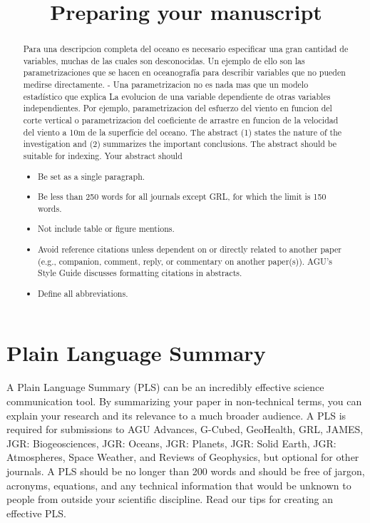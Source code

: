 \documentclass[
]{agujournal2019}
\providecommand{\tightlist}{%
  \setlength{\itemsep}{0pt}\setlength{\parskip}{0pt}}\usepackage{longtable,booktabs,array}
\begin{document}
\title{Preparing your manuscript}



\begin{abstract}
Para una descripci\textquotesingle on completa del
oc\textquotesingle eano es necesario especificar una gran cantidad de
variables, muchas de las cuales son desconocidas. Un ejemplo de ello son
las parametrizaciones que se hacen en oceanografía para describir
variables que no pueden medirse directamente. - Una
parametrizaci\textquotesingle on no es nada mas que un modelo
estadístico que explica La evoluci\textquotesingle on de una variable
dependiente de otras variables independientes. Por ejemplo,
parametrizaci\textquotesingle on del esfuerzo del viento en
funci\textquotesingle on del corte vertical o
parametrizaci\textquotesingle on del coeficiente de arrastre en
funci\textquotesingle on de la velocidad del viento a 10m de la
superfície del oc\textquotesingle eano. The abstract (1) states the
nature of the investigation and (2) summarizes the important
conclusions. The abstract should be suitable for indexing. Your abstract
should

\begin{itemize}
\tightlist
\item
  Be set as a single paragraph.
\item
  Be less than 250 words for all journals except GRL, for which the
  limit is 150 words.
\item
  Not include table or figure mentions.
\item
  Avoid reference citations unless dependent on or directly related to
  another paper (e.g., companion, comment, reply, or commentary on
  another paper(s)). AGU's Style Guide discusses formatting citations in
  abstracts.
\item
  Define all abbreviations.
\end{itemize}
\end{abstract}

\section*{Plain Language Summary}
A Plain Language Summary (PLS) can be an incredibly effective science
communication tool. By summarizing your paper in non-technical terms,
you can explain your research and its relevance to a much broader
audience. A PLS is required for submissions to AGU Advances, G-Cubed,
GeoHealth, GRL, JAMES, JGR: Biogeosciences, JGR: Oceans, JGR: Planets,
JGR: Solid Earth, JGR: Atmospheres, Space Weather, and Reviews of
Geophysics, but optional for other journals. A PLS should be no longer
than 200 words and should be free of jargon, acronyms, equations, and
any technical information that would be unknown to people from outside
your scientific discipline. Read our tips for creating an effective PLS.
\end{document}

